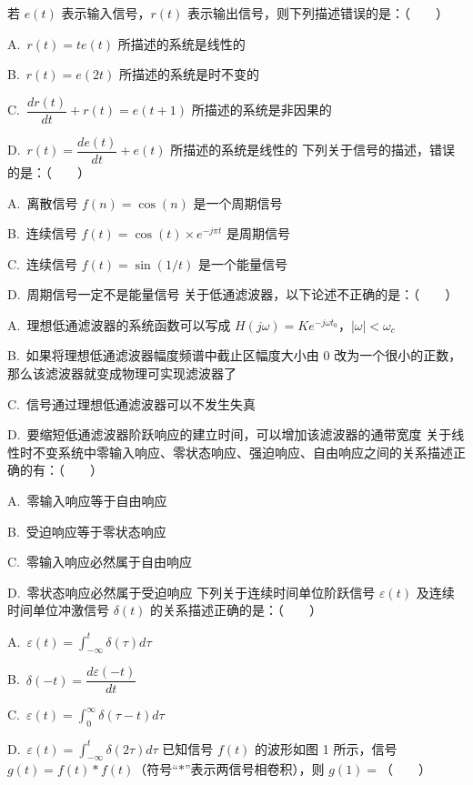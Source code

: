 \documentclass[12pt,a4paper]{exampaper}
\begin{document}
\begin{examquestions}
  \examquestion 若 $e(t)$ 表示输入信号，$r(t)$ 表示输出信号，则下列描述错误的是：（　　）

  A.\ $r(t)=te(t)$ 所描述的系统是线性的

  B.\ $r(t)=e(2t)$ 所描述的系统是时不变的

  C.\ $\dfrac{dr(t)}{dt}+r(t)=e(t+1)$ 所描述的系统是非因果的

  D.\ $r(t)=\dfrac{de(t)}{dt}+e(t)$ 所描述的系统是线性的
  \examquestion 下列关于信号的描述，错误的是：（　　）

  A.\ 离散信号 $f(n)=\cos(n)$ 是一个周期信号

  B.\ 连续信号 $f(t)=\cos(t)\times e^{-j\pi t}$ 是周期信号

  C.\ 连续信号 $f(t)=\sin(1/t)$ 是一个能量信号

  D.\ 周期信号一定不是能量信号
  \examquestion 关于低通滤波器，以下论述不正确的是：（　　）

  A.\ 理想低通滤波器的系统函数可以写成 $H(j\omega)=Ke^{-j\omega t_0}$，$|\omega|<\omega_c$

  B.\ 如果将理想低通滤波器幅度频谱中截止区幅度大小由 $0$ 改为一个很小的正数，那么该滤波器就变成物理可实现滤波器了

  C.\ 信号通过理想低通滤波器可以不发生失真

  D.\ 要缩短低通滤波器阶跃响应的建立时间，可以增加该滤波器的通带宽度
  \examquestion 关于线性时不变系统中零输入响应、零状态响应、强迫响应、自由响应之间的关系描述正确的有：（　　）

  A.\ 零输入响应等于自由响应

  B.\ 受迫响应等于零状态响应

  C.\ 零输入响应必然属于自由响应

  D.\ 零状态响应必然属于受迫响应
  \examquestion 下列关于连续时间单位阶跃信号 $\varepsilon(t)$ 及连续时间单位冲激信号 $\delta(t)$ 的关系描述正确的是：（　　）

  A.\ $\varepsilon(t)=\displaystyle\int_{-\infty}^{t}\delta(\tau)d\tau$

  B.\ $\delta(-t)=\dfrac{d\varepsilon(-t)}{dt}$

  C.\ $\varepsilon(t)=\displaystyle\int_{0}^{\infty}\delta(\tau-t)d\tau$

  D.\ $\varepsilon(t)=\displaystyle\int_{-\infty}^{t}\delta(2\tau)d\tau$
  \examquestion 已知信号 $f(t)$ 的波形如图 1 所示，信号 $g(t)=f(t)*f(t)$（符号“$*$”表示两信号相卷积），则 $g(1)=$（　　）


\end{examquestions}
\end{document}
